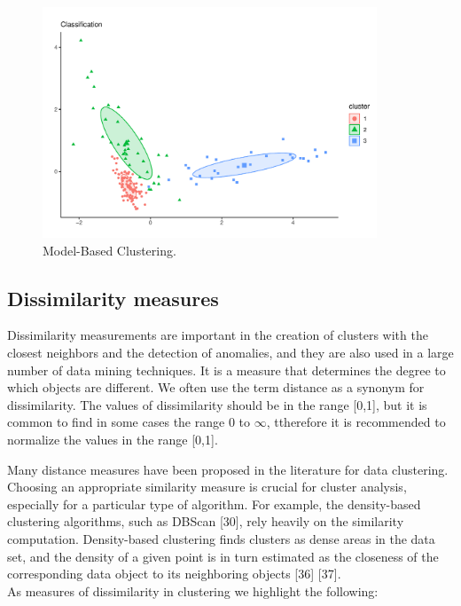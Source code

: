 \documentclass[
]{article}
\begin{document}
\begin{itemize}
  \begin{figure}
  \centering
  \includegraphics[width=\textwidth,height=2.70833in]{img/model.pdf}
  \caption{Model-Based Clustering. \label{model}}
  \end{figure}

  \newpage
\end{itemize}

\hypertarget{dissimilarity-measures}{%
\subsection{Dissimilarity measures}\label{dissimilarity-measures}}

Dissimilarity measurements are important in the creation of clusters
with the closest neighbors and the detection of anomalies, and they are
also used in a large number of data mining techniques. It is a measure
that determines the degree to which objects are different. We often use
the term distance as a synonym for dissimilarity. The values of
dissimilarity should be in the range {[}0,1{]}, but it is common to find
in some cases the range 0 to \(\infty\), ttherefore it is recommended to
normalize the values in the range {[}0,1{]}.

Many distance measures have been proposed in the literature for data
clustering. Choosing an appropriate similarity measure is crucial for
cluster analysis, especially for a particular type of algorithm. For
example, the density-based clustering algorithms, such as DBScan
{[}30{]}, rely heavily on the similarity computation. Density-based
clustering finds clusters as dense areas in the data set, and the
density of a given point is in turn estimated as the closeness of the
corresponding data object to its neighboring objects {[}36{]}
{[}37{]}.\\
As measures of dissimilarity in clustering we highlight the following:
\end{document}
